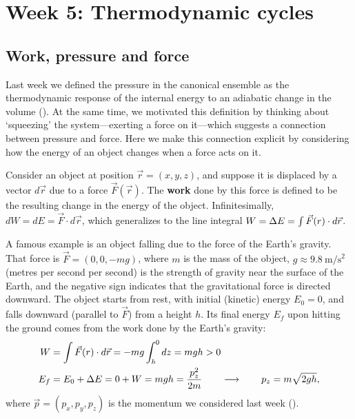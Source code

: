 \renewcommand{\thisweek}{MATH327 Week 5}
\renewcommand{\moddate}{Last modified 26 Feb.~2021}
\setcounter{section}{5}
\setcounter{subsection}{0}
{}
\section*{Week 5: Thermodynamic cycles}
\subsection{Work, pressure and force}
Last week we defined the pressure in the canonical ensemble as the thermodynamic response of the internal energy to an adiabatic change in the volume ().
At the same time, we motivated this definition by thinking about `squeezing' the system---exerting a force on it---which suggests a connection between pressure and force.
Here we make this connection explicit by considering how the energy of an object changes when a force acts on it.

\begin{shaded}
  Consider an object at position $\vec r = (x, y, z)$, and suppose it is displaced by a vector $d\vec r$ due to a force $\vec F(\vec r)$.
  The \textbf{work} done by this force is defined to be the resulting change in the energy of the object.
  Infinitesimally, $dW = dE = \vec F\cdot d\vec r$, which generalizes to the line integral $W = \Delta E = \int \vec F(r)\cdot d\vec r$.
\end{shaded}

A famous example is an object falling due to the force of the Earth's gravity.
That force is $\vec F = (0, 0, -mg)$, where $m$ is the mass of the object, $g \approx 9.8~\mathrm{m}/\mathrm{s}^2$ (metres per second per second) is the strength of gravity near the surface of the Earth, and the negative sign indicates that the gravitational force is directed downward.
The object starts from rest, with initial (kinetic) energy $E_0 = 0$, and falls downward (parallel to $\vec F$) from a height $h$.
Its final energy $E_f$ upon hitting the ground comes from the work done by the Earth's gravity:
\begin{align*}
  W & = \int \vec F(r)\cdot d\vec r = -mg \int_h^0 dz = mgh > 0 \\
  E_f & = E_0 + \Delta E = 0 + W = mgh = \frac{p_z^2}{2m} \qquad \longrightarrow \qquad p_z = m\sqrt{2gh},
\end{align*}
where $\vec p = (p_x, p_y, p_z)$ is the momentum we considered last week ().

